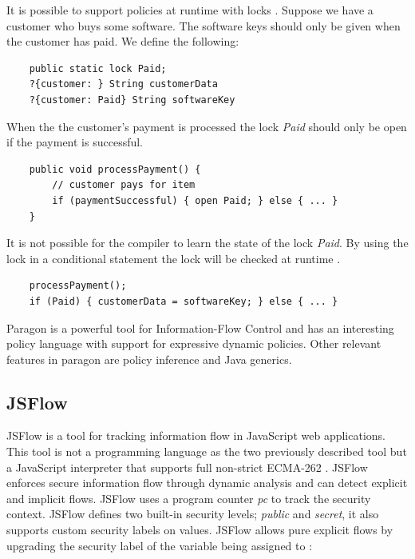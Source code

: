 It is possible to support policies at runtime with locks \cite{paragonprogramming}. Suppose we have a customer who buys some software. The software keys should only be given when the customer has paid. We define the following:

\begin{lstlisting}
	public static lock Paid;
	?{customer: } String customerData
	?{customer: Paid} String softwareKey
\end{lstlisting}

When the the customer's payment is processed the lock \emph{Paid} should only be open if the payment is successful. 

\begin{lstlisting}
	public void processPayment() {
		// customer pays for item
		if (paymentSuccessful) { open Paid; } else { ... }
	}
\end{lstlisting}

It is not possible for the compiler to learn the state of the lock \emph{Paid}. By using the lock in a conditional statement the lock will be checked at runtime \cite{paragonprogramming}.

\begin{lstlisting}
	processPayment();
	if (Paid) { customerData = softwareKey; } else { ... }
\end{lstlisting}   

Paragon is a powerful tool for Information-Flow Control and has an interesting policy language with support for expressive dynamic policies. Other relevant features in paragon are policy inference and Java generics.

\subsection{JSFlow}

JSFlow is a tool for tracking information flow in JavaScript web applications. This tool is not a programming language as the two previously described tool but a JavaScript interpreter that supports full non-strict ECMA-262 \cite{jsflowsite}. JSFlow enforces secure information flow through dynamic analysis and can detect explicit and implicit flows. JSFlow uses a program counter \emph{pc} to track the security context. JSFlow defines two built-in security levels; \emph{public} and \emph{secret}, it also supports custom security labels on values. JSFlow allows pure explicit flows by upgrading the security label of the variable being assigned to \cite{jsflowsite}:

